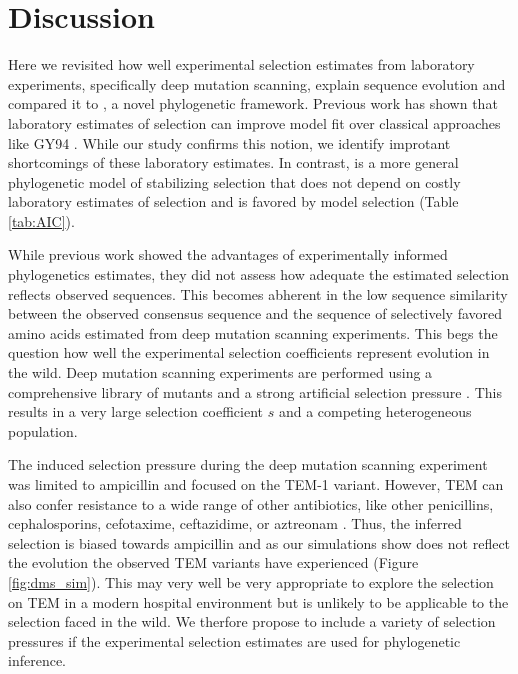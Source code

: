 \documentclass[12pt]{article}
\begin{document}
\section*{Discussion}

Here we revisited how well experimental selection estimates from laboratory experiments, specifically deep mutation scanning, explain sequence evolution and compared it to \selac, a novel phylogenetic framework.
Previous work has shown that laboratory estimates of selection can improve model fit over classical approaches like GY94 \citep{bloom2014, bloom2017}.
While our study confirms this notion, we identify improtant shortcomings of these laboratory estimates.
In contrast, \selac is a more general phylogenetic model of stabilizing selection that does not depend on costly laboratory estimates of selection and is favored by model selection (Table \ref{tab:AIC}).

While previous work showed the advantages of experimentally informed phylogenetics estimates, they did not assess how adequate the estimated selection reflects observed sequences.
This becomes abherent in the low sequence similarity between the observed consensus sequence and the sequence of selectively favored amino acids estimated from deep mutation scanning experiments.
This begs the question how well the experimental selection coefficients represent evolution in the wild.
Deep mutation scanning experiments are performed using a comprehensive library of mutants and a strong artificial selection pressure \citep{FirnbergAndOstermeier2012, Jain2014, FowlerAndFields2014, Fowler2014}.
This results in a very large selection coefficient $s$ and a competing heterogeneous population.

The induced selection pressure during the deep mutation scanning experiment was limited to ampicillin \citep{stiffler2016} and focused on the TEM-1 variant.
However, TEM can also confer resistance to a wide range of other antibiotics, like other penicillins, cephalosporins, cefotaxime, ceftazidime, or aztreonam \citep{sougakoff1988,sougakoff1989,goussard1991,mabilat1992,chanal1992,brun1994}.
Thus, the inferred selection is biased towards ampicillin and as our simulations show does not reflect the evolution the observed TEM variants have experienced (Figure \ref{fig:dms_sim}).
This may very well be very appropriate to explore the selection on TEM in a modern hospital environment but is unlikely to be applicable to the selection faced in the wild.
We therfore propose to include a variety of selection pressures if the experimental selection estimates are used for phylogenetic inference.
\end{document}
